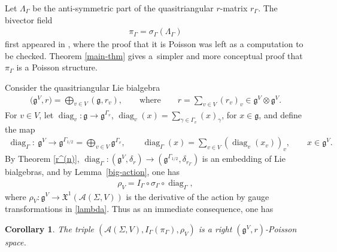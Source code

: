 \documentclass[10pt,a4paper]{amsart}
\numberwithin{equation}{section}
\newtheorem{Corollary}[Theorem]{Corollary}
\newcommand{\XX}{\mathfrak{X}}
\def \g {\mathfrak{a}}
\def \g {\mathfrak{g}}
\def \A {{\mathcal{A}}}
\DeclareMathOperator{\diag}{diag}
\def \sV {{\scriptscriptstyle V}}
\def \sGam {{\scriptscriptstyle \Gamma}}
\begin{document}
\begin{Remark}Let $\Lambda_{\sGam}$ be the anti-symmetric part of the quasitriangular $r$-matrix $r_\sGam$. The bivector f\/ield
\begin{gather*}
\pi_\sGam = \sigma_\sGam(\Lambda_\sGam)
\end{gather*}
f\/irst appeared in \cite{FR2, FR1}, where the proof that it is Poisson was left as a computation to be checked. Theorem \ref{main-thm} gives a~simpler and more conceptual proof that $\pi_\Gamma$ is a Poisson structure.
\end{Remark}

Consider the quasitriangular Lie bialgebra
\begin{gather}
\big(\g^{\sV}, r\big) = \bigoplus_{v \in V} (\g, r_v), \qquad \text{where} \qquad r = \sum_{v \in V} (r_v)_v \in \g^{\sV} \otimes \g^{\sV}. \label{small-lie-bialg}
\end{gather}
For $v \in V$, let $\diag_v\colon \g \to \g^{\sGam_v}$, $\diag_v(x) = \sum_{\gamma \in \Gamma_v} (x)_\gamma$, for $x \in \g$, and def\/ine the map
\begin{gather}
\diag_{\sGam}\colon \ \g^{\sV} \to \g^{\sGam_{1/2}} = \bigoplus_{v \in V} \g^{\sGam_v}, \qquad \diag_{\sGam}(x) = \sum_{v \in V} (\diag_v(x_v))_v, \qquad x \in \g^{\sV}. \label{defn-Delta}
\end{gather}
By Theorem \ref{r^(n)}, $\diag_\sGam\colon (\g^{\sV}, \delta_r) \to (\g^{\sGam_{1/2}}, \delta_{r_{\sGam}})$ is an embedding of Lie bialgebras, and by Lemma~\ref{big-action}, one has
\begin{gather}
\rho_{\sV} = I_\Gamma \circ \sigma_{\sGam} \circ \diag_{\sGam}, \label{annoyingrelation}
\end{gather}
where $\rho_{\sV}\colon \g^\sV \to \XX^1(\A(\Sigma, V))$ is the derivative of the action by gauge transformations in \eqref{lambda}. Thus as an immediate consequence, one has

\begin{Corollary} \label{cor-gauge-action}
The triple $(\A(\Sigma, V), I_\Gamma(\pi_{\sGam}), \rho_{\sV})$ is a right $(\g^{\sV}, r)$-Poisson space.
\end{Corollary}
\end{document}
